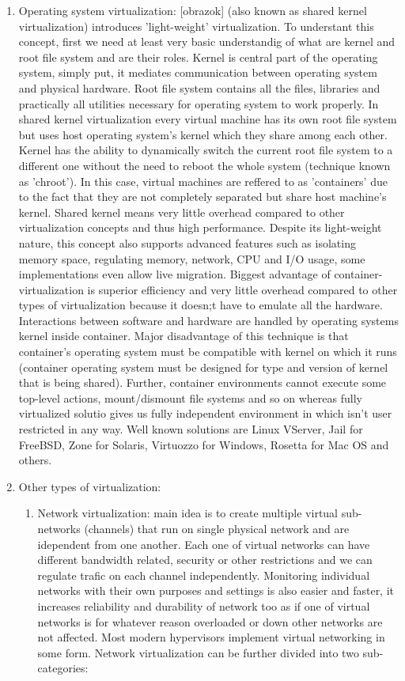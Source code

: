 \begin{itemize}
\begin{enumerate}
\item Operating system virtualization: [obrazok] (also known as shared kernel virtualization) introduces 'light-weight' virtualization. To understant this concept, first we need at least very basic understandig of what are kernel and root file system and are their roles. Kernel is central part of the operating system, simply put, it mediates communication between operating system and physical hardware. Root file system contains all the files, libraries and practically all utilities necessary for operating system to work properly. In shared kernel virtualization every virtual machine has its own root file system but uses host operating system's kernel which they share among each other. Kernel has the ability to dynamically switch the current root file system to a different one without the need to reboot the whole system (technique known as 'chroot'). In this case, virtual machines are reffered to as 'containers' due to the fact that they are not completely separated but share host machine's kernel. Shared kernel means very little overhead compared to other virtualization concepts and thus high performance. Despite its light-weight nature, this concept also supports advanced features such as isolating memory space, regulating memory, network, CPU and I/O usage, some implementations even allow live migration. Biggest advantage of container-virtualization is superior efficiency and very little overhead compared to other types of virtualization because it doesn;t have to emulate all the hardware. Interactions between software and hardware are handled by operating systems kernel inside container. Major disadvantage of this technique is that container's operating system must be compatible with kernel on which it runs (container operating system must be designed for type and version of kernel that is being shared). Further, container environments cannot execute some top-level actions, mount/dismount file systems and so on whereas fully virtualized solutio gives us fully independent environment in which isn't user restricted in any way.
Well known solutions are Linux VServer, Jail for FreeBSD, Zone for Solaris, Virtuozzo for Windows, Rosetta for Mac OS and others.

\item Other types of virtualization:
\begin{enumerate}
\item Network virtualization: main idea is to create multiple virtual sub-networks (channels) that run on single physical network and are idependent from one another. Each one of virtual networks can have different bandwidth related, security or other restrictions and we can regulate trafic on each channel independently.  Monitoring individual networks with their own purposes and settings is also easier and faster, it increases reliability and durability of network too as if one of virtual networks is for whatever reason overloaded or down other networks are not affected. Most modern hypervisors implement virtual networking in some form. Network virtualization can be further divided into two sub-categories:
\begin{enumerate}


\end{enumerate}
\end{enumerate}
\end{enumerate}
\end{itemize}
